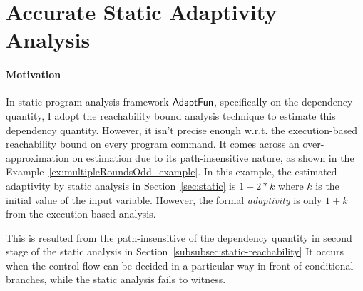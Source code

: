 \section{Accurate Static Adaptivity Analysis}
\label{sec:refine-static}

% 

\paragraph*{Motivation}
In static program analysis framework $\textsf{AdaptFun}$, specifically on the dependency quantity, 
I adopt the reachability bound analysis technique to estimate this dependency quantity.
However, it isn't precise enough w.r.t. the execution-based reachability bound on every program command.
It comes across an over-approximation on estimation due to its path-insensitive nature,
as shown in the Example~\ref{ex:multipleRoundsOdd_example}.
In this example, the estimated adaptivity by static analysis in Section~\ref{sec:static} 
is $1 + 2*k$ where $k$ is the initial value of the input variable.
However, the formal \emph{adaptivity} is only $1 + k$ from the execution-based analysis.

This is resulted from the  path-insensitive of the dependency quantity in
second stage of the static analysis in Section~\ref{subsubsec:static-reachability}
It occurs when the control flow can be decided in a particular way in front of conditional branches, 
while the static analysis fails to witness. 


